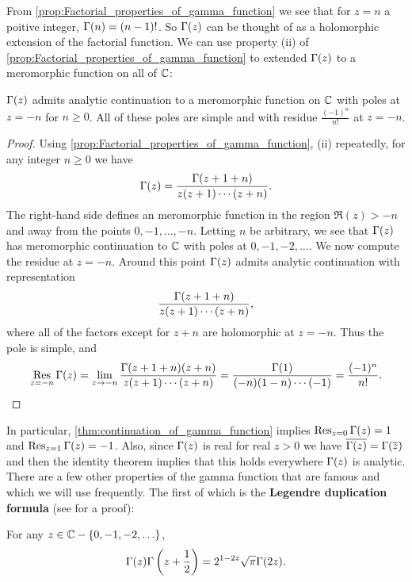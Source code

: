       From \cref{prop:Factorial_properties_of_gamma_function} we see that for $z = n$ a poitive integer, $\Gamma(n) = (n-1)!$. So $\Gamma(z)$ can be thought of as a holomorphic extension of the factorial function. We can use property (ii) of \cref{prop:Factorial_properties_of_gamma_function} to extended $\Gamma(z)$ to a meromorphic function on all of $\mathbb{C}$:

      \begin{theorem}\label{thm:continuation_of_gamma_function}
        $\Gamma(z)$ admits analytic continuation to a meromorphic function on $\mathbb{C}$ with poles at $z = -n$ for $n \ge 0$. All of these poles are simple and with residue $\frac{(-1)^{n}}{n!}$ at $z = -n$.
      \end{theorem}
      \begin{proof}
        Using \cref{prop:Factorial_properties_of_gamma_function}, (ii) repeatedly, for any integer $n \ge 0$ we have
        \[
          \Gamma(z) = \frac{\Gamma(z+1+n)}{z(z+1) \cdots (z+n)}.
        \]
        The right-hand side defines an meromorphic function in the region $\Re(z) > -n$ and away from the points $0,-1,\ldots,-n$. Letting $n$ be arbitrary, we see that $\Gamma(z)$ has meromorphic continuation to $\mathbb{C}$ with poles at $0,-1,-2,\ldots$. We now compute the residue at $z = -n$. Around this point $\Gamma(z)$ admits analytic continuation with representation
        \[
          \frac{\Gamma(z+1+n)}{z(z+1) \cdots (z+n)},
        \]
        where all of the factors except for $z+n$ are holomorphic at $z = -n$. Thus the pole is simple, and
        \[
          \operatorname*{\mathrm{Res}}_{z = -n}\Gamma(z) = \lim_{z \to -n}\frac{\Gamma(z+1+n)(z+n)}{z(z+1) \cdots (z+n)} = \frac{\Gamma(1)}{(-n)(1-n) \cdots (-1)} = \frac{(-1)^{n}}{n!}.
        \]
      \end{proof}

      In particular, \cref{thm:continuation_of_gamma_function} implies $\operatorname*{\mathrm{Res}}_{z = 0}\Gamma(z) = 1$ and $\operatorname*{\mathrm{Res}}_{z = 1}\Gamma(z) = -1$. Also, since $\Gamma(z)$ is real for real $z > 0$ we have $\overline{\Gamma(z)} = \Gamma(\overline{z})$ and then the identity theorem implies that this holds everywhere $\Gamma(z)$ is analytic. There are a few other properties of the gamma function that are famous and which we will use frequently. The first of which is the \textbf{Legendre duplication formula} (see \cite{remmert1998classical} for a proof):

      \begin{theorem}
        For any $z \in \mathbb{C}-\{0,-1,-2,\ldots\}$,
        \[
          \Gamma(z)\Gamma\left(z+\frac{1}{2}\right) = 2^{1-2z}\sqrt{\pi}\Gamma(2z).
        \]
      \end{theorem}

